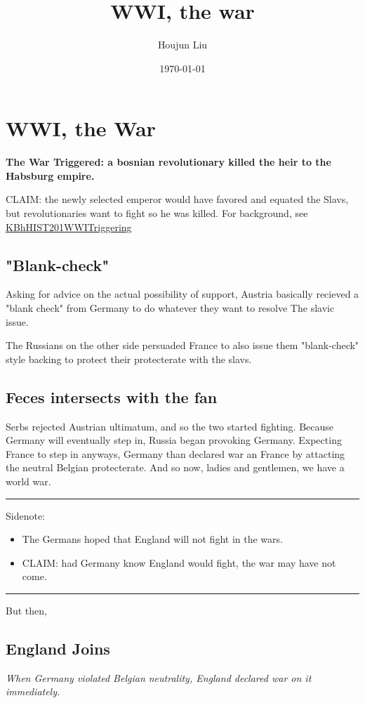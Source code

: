 \documentclass[letterpaper]{article}
\author{Houjun Liu}
\date{\today}
\title{WWI, the war}
\renewcommand{\tableofcontents}{}
\begin{document}
\tableofcontents



\section{WWI, the War}
\label{sec:org215684e}
\textbf{The War Triggered: a bosnian revolutionary killed the heir to the
Habsburg empire.}

CLAIM: the newly selected emperor would have favored and equated the
Slavs, but revolutionaries want to fight so he was killed. For
background, see
\href{KBhHIST201WWITriggering.org}{KBhHIST201WWITriggering}

\subsection{"Blank-check"}
\label{sec:org2aff464}
Asking for advice on the actual possibility of support, Austria
basically recieved a "blank check" from Germany to do whatever they want
to resolve The slavic issue.

The Russians on the other side persuaded France to also issue them
"blank-check" style backing to protect their protecterate with the
slavs.

\subsection{Feces intersects with the fan}
\label{sec:orgde809e2}
Serbs rejected Austrian ultimatum, and so the two started fighting.
Because Germany will eventually step in, Russia began provoking Germany.
Expecting France to step in anyways, Germany than declared war an France
by attacting the neutral Belgian protecterate. And so now, ladies and
gentlemen, we have a world war.

\noindent\rule{\textwidth}{0.5pt}

Sidenote:

\begin{itemize}
\item The Germans hoped that England will not fight in the wars.
\item CLAIM: had Germany know England would fight, the war may have not
come.
\end{itemize}

\noindent\rule{\textwidth}{0.5pt}

But then,

\subsection{England Joins}
\label{sec:org5f219ce}
\emph{When Germany violated Belgian neutrality, England declared war on it
immediately.}
\end{document}
